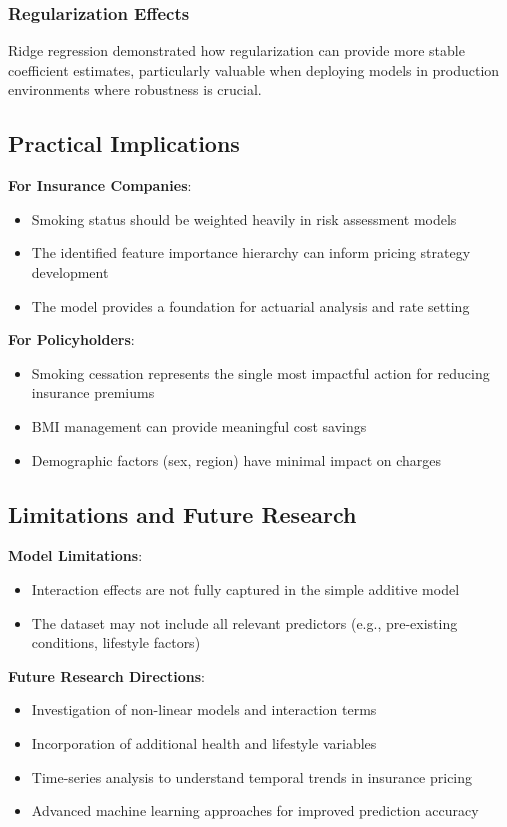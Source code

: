 \documentclass[12pt,a4paper]{article}
\begin{document}
\subsubsection{Regularization Effects}
    Ridge regression demonstrated how regularization can provide more stable coefficient estimates, particularly valuable when deploying models in production environments where robustness is crucial.

\subsection{Practical Implications}

\textbf{For Insurance Companies}:
\begin{itemize}
    \item Smoking status should be weighted heavily in risk assessment models
    \item The identified feature importance hierarchy can inform pricing strategy development
    \item The model provides a foundation for actuarial analysis and rate setting
\end{itemize}

\textbf{For Policyholders}:
\begin{itemize}
    \item Smoking cessation represents the single most impactful action for reducing insurance premiums
    \item BMI management can provide meaningful cost savings
    \item Demographic factors (sex, region) have minimal impact on charges
\end{itemize}

\subsection{Limitations and Future Research}

\textbf{Model Limitations}:
\begin{itemize}
    \item Interaction effects are not fully captured in the simple additive model
    \item The dataset may not include all relevant predictors (e.g., pre-existing conditions, lifestyle factors)
\end{itemize}

\textbf{Future Research Directions}:
\begin{itemize}
    \item Investigation of non-linear models and interaction terms
    \item Incorporation of additional health and lifestyle variables
    \item Time-series analysis to understand temporal trends in insurance pricing
    \item Advanced machine learning approaches for improved prediction accuracy
\end{itemize}
\end{document}
